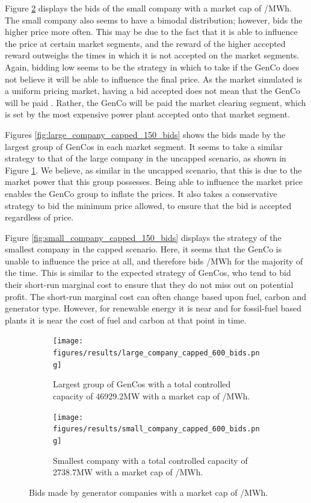 \documentclass[conference]{IEEEtran}
\begin{document}
Figure \ref{fig:small_company_capped_600_bids} displays the bids of the small company with a market cap of /MWh. The small company also seems to have a bimodal distribution; however, bids the higher price more often. This may be due to the fact that it is able to influence the price at certain market segments, and the reward of the higher accepted reward outweighs the times in which it is not accepted on the market segments. Again, bidding low seems to be the strategy in which to take if the GenCo does not believe it will be able to influence the final price. As the market simulated is a uniform pricing market, having a  bid accepted does not mean that the GenCo will be paid . Rather, the GenCo will be paid the market clearing segment, which is set by the most expensive power plant accepted onto that market segment.



Figures \ref{fig:large_company_capped_150_bids} shows the bids made by the largest group of GenCos in each market segment. It seems to take a similar strategy to that of the large company in the uncapped scenario, as shown in Figure \ref{fig:large_company_capped_600_bids}. We believe, as similar in the uncapped scenario, that this is due to the market power that this group possesses. Being able to influence the market price enables the GenCo group to inflate the prices. It also takes a conservative strategy to bid the minimum price allowed, to ensure that the bid is accepted regardless of price.

Figure \ref{fig:small_company_capped_150_bids} displays the strategy of the smallest company in the capped scenario. Here, it seems that the GenCo is unable to influence the price at all, and therefore bids /MWh for the majority of the time. This is similar to the expected strategy of GenCos, who tend to bid their short-run marginal cost to ensure that they do not miss out on potential profit. The short-run marginal cost can often change based upon fuel, carbon and generator type. However, for renewable energy it is near  and for fossil-fuel based plants it is near the cost of fuel and carbon at that point in time.


\begin{figure}
\centering
\begin{subfigure}[b]{0.49\textwidth}   
\texttt{[image: figures/results/large\_company\_capped\_600\_bids.png]}
\caption{Largest group of GenCos with a total controlled capacity of 46929.2MW with a market cap of /MWh.}
\label{fig:large_company_capped_600_bids}
\end{subfigure}
\hfil
\begin{subfigure}[b]{0.49\textwidth}   
\texttt{[image: figures/results/small\_company\_capped\_600\_bids.png]}
\caption{Smallest company with a total controlled capacity of 2738.7MW with a market cap of /MWh.}
\label{fig:small_company_capped_600_bids}
\end{subfigure}
\caption{Bids made by generator companies with a market cap of /MWh.}
\label{fig:capped_600_bids}
\end{figure}
\end{document}
